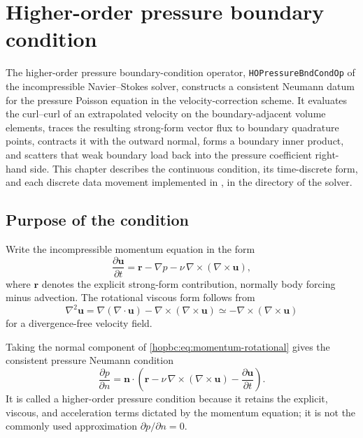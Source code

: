 \chapter{Higher-order pressure boundary condition}
\label{chap:hopressure-bndcond}

\providecommand{\vect}[1]{\boldsymbol{#1}}

The higher-order pressure boundary-condition operator,
\texttt{HOPressureBndCondOp} of the incompressible Navier--Stokes solver,
constructs a consistent Neumann datum for the pressure Poisson equation in
the velocity-correction scheme. It evaluates the curl--curl of an
extrapolated velocity on the boundary-adjacent volume elements, traces the
resulting strong-form vector flux to boundary quadrature points, contracts it
with the outward normal, forms a boundary inner product, and scatters that
weak boundary load back into the pressure coefficient right-hand side. This
chapter describes the continuous condition, its time-discrete form, and each
discrete data movement implemented in , in
the directory  of the solver.

\section{Purpose of the condition}

Write the incompressible momentum equation in the form
\begin{equation}
  \frac{\partial \vect{u}}{\partial t}
  = \vect{r} - \nabla p
    - \nu\,\nabla\times(\nabla\times\vect{u}),
  \label{hopbc:eq:momentum-rotational}
\end{equation}
where \(\vect{r}\) denotes the explicit strong-form contribution, normally
body forcing minus advection.  The rotational viscous form follows from
\begin{equation}
  \nabla^2\vect{u}
  = \nabla(\nabla\cdot\vect{u})
    - \nabla\times(\nabla\times\vect{u})
  \simeq -\nabla\times(\nabla\times\vect{u})
\end{equation}
for a divergence-free velocity field.

Taking the normal component of \eqref{hopbc:eq:momentum-rotational} gives the
consistent pressure Neumann condition
\begin{equation}
  \boxed{
  \frac{\partial p}{\partial n}
  = \vect{n}\cdot
    \left(
      \vect{r}
      - \nu\,\nabla\times(\nabla\times\vect{u})
      - \frac{\partial\vect{u}}{\partial t}
    \right).}
  \label{hopbc:eq:continuous-hop}
\end{equation}
It is called a higher-order pressure condition because it retains the
explicit, viscous, and acceleration terms dictated by the momentum equation;
it is not the commonly used approximation \(\partial p/\partial n=0\).

